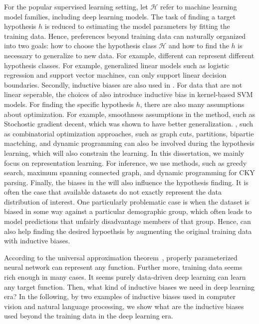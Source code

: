 For the popular supervised learning setting, let $\mathcal{H}$ refer
to machine learning model families, including deep learning
models. The task of finding a target hypothesis $h$ is reduced to
estimating the model parameters by fitting the training data. Hence,
preferences beyond training data can naturally organized into two
goals: how to choose the hypothesis class $\mathcal{H}$ and how to
find the $h$ is necessary to generalize to new data. For example,
different  can represent different hypothesis
classes. For example, generalized linear models such as logistic
regression and support vector machines, can only support linear
decision boundaries.  Secondly, inductive biases are also used in
. For data that are not linear seperable, the
choices of  also introduce inductive bias in
kernel-based SVM models. For finding the specific hypothesis $h$,
there are also many assumptions about optimization. For example,
smoothness assumptions in the  method, such as
Stochostic gradient decent, which was shown to have better
generalization.  , such as combinatorial
optimization approaches, such as graph cuts, partitions, bipartie
mactching, and dynamic programming can also be involved during the
hypothesis learning, which will also constrain the learning. In this
dissertation, we mainly focus on representation learning. For
inference, we use methods, such as greedy search, maximum spanning
connected graph, and dynamic programming for CKY parsing. Finally, the
biases in the  will also influence the hypothesis
finding. It is often the case that available datasets do not exactly
represent the data distribution of interest.  One particularly
problematic case is when the dataset is biased in some way against a
particular demographic group, which often leads to model predictions
that unfairly disadvantage members of that group. Hence,  can also help finding the desired hypoethsis by
augmenting the original training data with inductive biases.

According to the universal approximation
theorem~\citep{hornik1989multilayer}, properly parameterized neural
network can represent any function. Further more, training data seems
rich enough in many cases. It seems purely data-driven deep learning
can learn any target function. Then, what kind of inductive biases we
need in deep learning era? In the following, by two examples of
inductive biases used in computer vision and natural language
processing, we show what are the inductive biases used beyond the
training data in the deep learning era.

